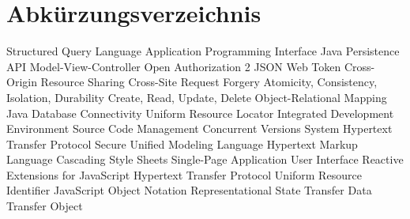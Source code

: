 \chapter{Abkürzungsverzeichnis}

			{Structured Query Language}
			{Application Programming Interface}
			{Java Persistence API}
			{Model-View-Controller}
		{Open Authorization 2}
			{JSON Web Token}
			{Cross-Origin Resource Sharing}
			{Cross-Site Request Forgery}
			{Atomicity, Consistency, Isolation, Durability}
			{Create, Read, Update, Delete}
			{Object-Relational Mapping}
		{Java Database Connectivity Uniform Resource Locator}
			{Integrated Development Environment}
	      {Source Code Management }
			{Concurrent Versions System}
		{Hypertext Transfer Protocol Secure}
			{Unified Modeling Language}
			{Hypertext Markup Language}
			{Cascading Style Sheets}
			{Single-Page Application}
			{User Interface}
			{Reactive Extensions for JavaScript}
			{Hypertext Transfer Protocol}
			{Uniform Resource Identifier}
			{JavaScript Object Notation}
		{Representational State Transfer}
			{Data Transfer Object}


